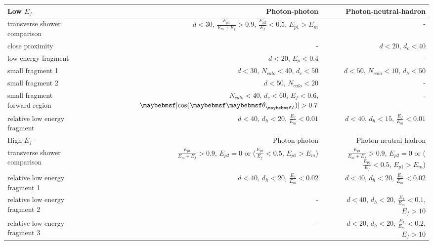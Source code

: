 \begin{table}[htbp]
\centering

\smallskip

\begin{tabular}{l  r  r }
\hline
\hline
Low $E_f$ &  Photon-photon & Photon-neutral-hadron \\
\hline
\multicolumn{1}{L{0.3\textwidth}}{transverse shower comparison} & \multicolumn{1}{R{0.3\textwidth}}{$d < 30 $, $\frac{E_{p1}}{E_m + E_f} > 0.9 $, $\frac{E_{p2}}{E_f} < 0.5 $, $E_{p1} > E_m$}  & \multicolumn{1}{R{0.3\textwidth}}{-} \\
\multicolumn{1}{L{0.3\textwidth}}{close proximity} & \multicolumn{1}{R{0.3\textwidth}}{-}  & \multicolumn{1}{R{0.3\textwidth}}{$d < 20 $, $d_c < 40 $} \\
\multicolumn{1}{L{0.3\textwidth}}{low energy fragment} & \multicolumn{1}{R{0.3\textwidth}}{$d < 20 $, $E_p < 0.4 $}  & \multicolumn{1}{R{0.3\textwidth}}{-} \\
\multicolumn{1}{L{0.3\textwidth}}{small fragment 1} & \multicolumn{1}{R{0.3\textwidth}}{$d < 30 $, $N_{calo} < 40 $, $d_c < 50 $}  & \multicolumn{1}{R{0.3\textwidth}}{$d < 50 $, $N_{calo} < 10 $, $d_h < 50$} \\
\multicolumn{1}{L{0.3\textwidth}}{small fragment 2} & \multicolumn{1}{R{0.3\textwidth}}{$d < 50 $, $N_{calo} < 20 $}  & \multicolumn{1}{R{0.3\textwidth}}{-} \\
\multicolumn{1}{L{0.3\textwidth}}{small fragment forward region} & \multicolumn{1}{R{0.3\textwidth}}{$N_{calo} < 40$, $d_c < 60$, $E_f < 0.6$, $\absCosTheta > 0.7$}  & \multicolumn{1}{R{0.3\textwidth}}{-} \\
\multicolumn{1}{L{0.3\textwidth}}{relative low energy fragment} & \multicolumn{1}{R{0.3\textwidth}}{$d < 40$, $d_h < 20$, $\frac{E_{f}}{E_m} < 0.01$}  & \multicolumn{1}{R{0.3\textwidth}}{$d < 40$, $d_h < 15$, $\frac{E_{f}}{E_m} < 0.01$} \\
\hline
High $E_f$ &  Photon-photon & Photon-neutral-hadron \\
\hline
\multicolumn{1}{L{0.3\textwidth}}{transverse shower comparison} & \multicolumn{1}{R{0.3\textwidth}}{$\frac{E_{p1}}{E_m + E_f} > 0.9 $, $E_{p2} = 0$ or ($\frac{E_{p2}}{E_f} < 0.5 $, $E_{p1} > E_m$)}  & \multicolumn{1}{R{0.3\textwidth}}{$\frac{E_{p1}}{E_m + E_f} > 0.9 $, $E_{p2} = 0$ or ($\frac{E_{p2}}{E_f} < 0.5 $, $E_{p1} > E_m$)} \\
\multicolumn{1}{L{0.3\textwidth}}{relative low energy fragment 1} & \multicolumn{1}{R{0.3\textwidth}}{$d < 40$, $d_h < 20$, $\frac{E_f}{E_m} < 0.02$} & \multicolumn{1}{R{0.3\textwidth}}{$d < 40$, $d_h < 20$, $\frac{E_f}{E_m} < 0.02$} \\
\multicolumn{1}{L{0.3\textwidth}}{relative low energy fragment 2} & \multicolumn{1}{R{0.3\textwidth}}{-}  & \multicolumn{1}{R{0.3\textwidth}}{$d < 40$, $d_h < 20$, $\frac{E_f}{E_m} < 0.1$, $E_f > 10$} \\
\multicolumn{1}{L{0.3\textwidth}}{relative low energy fragment 3} & \multicolumn{1}{R{0.3\textwidth}}{-}  & \multicolumn{1}{R{0.3\textwidth}}{$d < 20$, $d_h < 20$, $\frac{E_f}{E_m} < 0.2$, $E_f > 10$} \\
\hline


\end{tabular}
\end{table}

